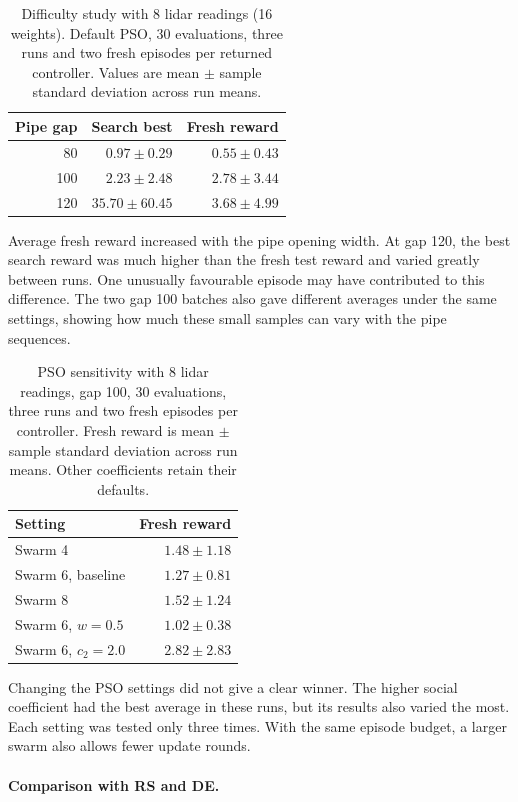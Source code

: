 \documentclass[runningheads]{llncs}
\begin{document}
\begin{table}[t]
\caption{Difficulty study with 8 lidar readings (16 weights). Default PSO, 30 evaluations, three runs and two fresh episodes per returned controller. Values are mean $\pm$ sample standard deviation across run means.}
\centering\small
\begin{tabular}{rrr}
\toprule
Pipe gap & Search best & Fresh reward \\
\midrule
80 & $0.97\pm0.29$ & $0.55\pm0.43$ \\
100 & $2.23\pm2.48$ & $2.78\pm3.44$ \\
120 & $35.70\pm60.45$ & $3.68\pm4.99$ \\
\bottomrule
\end{tabular}
\end{table}
Average fresh reward increased with the pipe opening width. At gap 120, the best search reward was much higher than the fresh test reward and varied greatly between runs. One unusually favourable episode may have contributed to this difference. The two gap 100 batches also gave different averages under the same settings, showing how much these small samples can vary with the pipe sequences.

\begin{table}[t]
\caption{PSO sensitivity with 8 lidar readings, gap 100, 30 evaluations, three runs and two fresh episodes per controller. Fresh reward is mean $\pm$ sample standard deviation across run means. Other coefficients retain their defaults.}
\centering\small
\begin{tabular}{lr}
\toprule
Setting & Fresh reward \\
\midrule
Swarm 4 & $1.48\pm1.18$ \\
Swarm 6, baseline & $1.27\pm0.81$ \\
Swarm 8 & $1.52\pm1.24$ \\
Swarm 6, $w=0.5$ & $1.02\pm0.38$ \\
Swarm 6, $c_2=2.0$ & $2.82\pm2.83$ \\
\bottomrule
\end{tabular}
\end{table}
Changing the PSO settings did not give a clear winner. The higher social coefficient had the best average in these runs, but its results also varied the most. Each setting was tested only three times. With the same episode budget, a larger swarm also allows fewer update rounds.

\paragraph{Comparison with RS and DE.}
\end{document}
